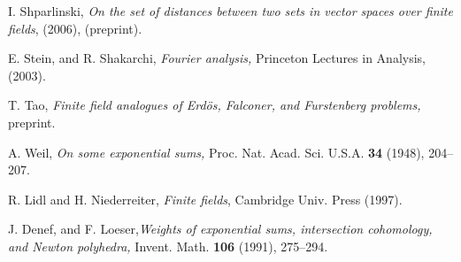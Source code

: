 \documentclass[11pt]{article}
\numberwithin{equation}{section}
\theoremstyle{plain}
\theoremstyle{definition}
\theoremstyle{remark}
\begin{document}
\begin{thebibliography}{17}
 I. Shparlinski, {\it On the set of distances between  
two sets in vector spaces over finite fields}, (2006), (preprint).

 E. Stein, and R. Shakarchi, {\it Fourier analysis,}  
Princeton Lectures in Analysis, (2003).

 T. Tao, {\it Finite field analogues of Erd\"os, Falconer,  
and Furstenberg problems,} preprint.

 A. Weil, {\it On some exponential sums,} Proc. Nat.  
Acad. Sci. U.S.A. \textbf{34}
(1948), 204--207.

 R. Lidl and H. Niederreiter, {\it Finite fields},
 Cambridge Univ. Press (1997).

 J. Denef, and F. Loeser,{\it Weights of exponential sums,
intersection cohomology, and Newton polyhedra,} Invent. Math.
\textbf{106} (1991), 275--294.


\end{thebibliography}
\end{document}
